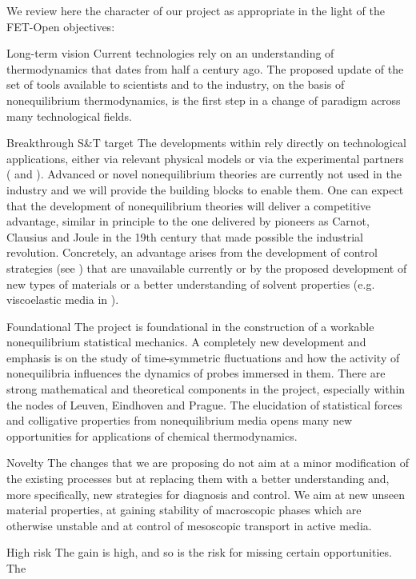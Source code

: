We review here the character of our project \TheProject as appropriate in the light of the
FET-Open objectives:
\begin{compactdesc}
\item[Long-term vision] Current technologies rely on an understanding of thermodynamics that
dates from half a century ago. The proposed update of the set of tools available to
scientists and to the industry, on the basis of nonequilibrium thermodynamics, is the first
step in a change of paradigm across many technological fields.
\item[Breakthrough S\&T target] The developments within \TheProject rely directly on
technological applications, either via relevant physical models or via the experimental
partners ( and ). Advanced or novel nonequilibrium theories are currently not used in
the industry and we will provide the building blocks to enable them. One can expect that the
development of nonequilibrium theories will deliver a competitive advantage, similar in
principle to the one delivered by pioneers as Carnot, Clausius and Joule in the 19th century that made possible the industrial revolution.
%
Concretely, an advantage arises from the development of control strategies (see
) that are unavailable currently or by the proposed development of new types of
materials or a better understanding of solvent properties (e.g. viscoelastic media in
).
\item[Foundational] The project is foundational in the construction of a workable
nonequilibrium statistical mechanics. A completely new development and emphasis is on the
study of time-symmetric fluctuations and how the activity of nonequilibria influences the
dynamics of probes immersed in them. There are strong mathematical and theoretical
components in the project, especially within the nodes of Leuven, Eindhoven and Prague.  The
elucidation of statistical forces and colligative properties from nonequilibrium media opens
many new opportunities for applications of chemical thermodynamics.
\item[Novelty] The changes that we are proposing do not aim at a minor modification of the
existing processes but at replacing them with a better understanding and, more specifically,
new strategies for diagnosis and control.  We aim at new unseen material properties, at
gaining stability of macroscopic phases which are otherwise unstable and at control of
mesoscopic transport in active media.
\item[High risk] The gain is high, and so is the risk for missing certain opportunities.  The

\end{compactdesc}

